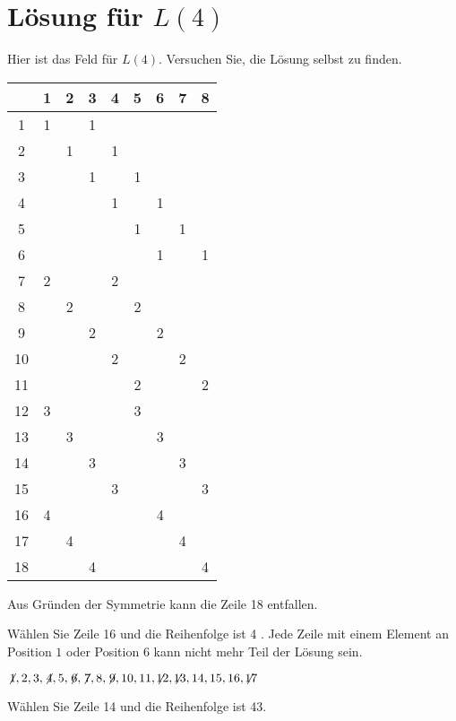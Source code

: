 \section{Lösung für $L(4)$}\label{s.langford-four}

Hier ist das Feld für $L(4)$. Versuchen Sie, die Lösung selbst zu finden.
\begin{center}
\addtolength{\tabcolsep}{4pt}
\begin{tabular}{|c||c|c|c|c|c|c|c|c|}
\hline
&1&2&3&4&5&6&7&8\\\hline\hline
1&1&&1&&&&&\\\hline
2&&1&&1&&&&\\\hline
3&&&1&&1&&&\\\hline
4&&&&1&&1&&\\\hline
5&&&&&1&&1&\\\hline
6&&&&&&1&&1\\\hline
7&2&&&2&&&&\\\hline
8&&2&&&2&&&\\\hline
9&&&2&&&2&&\\\hline
10&&&&2&&&2&\\\hline
11&&&&&2&&&2\\\hline
12&3&&&&3&&&\\\hline
13&&3&&&&3&&\\\hline
14&&&3&&&&3&\\\hline
15&&&&3&&&&3\\\hline
16&4&&&&&4&&\\\hline
17&&4&&&&&4&\\\hline
18&&&4&&&&&4\\\hline
\end{tabular}
\end{center}
Aus Gründen der Symmetrie kann die Zeile 18 entfallen.

\smallskip

\noindent Wählen Sie Zeile 16 und die Reihenfolge ist 4\textvisiblespace\textvisiblespace\textvisiblespace{} \textvisiblespace\textvisiblespace.
Jede Zeile mit einem Element an Position $1$ oder Position $6$ kann nicht mehr Teil der Lösung sein.

$\not\! 1,2,3,\not\! 4,5,\not\! 6,\not\! 7,8,\not\! 9,10,11,\not\!\! 12,\not\!\! 13,14,15,16,\not\!\! 17$

\noindent Wählen Sie Zeile 14 und die Reihenfolge ist 4\textvisiblespace{}3\textvisiblespace.

